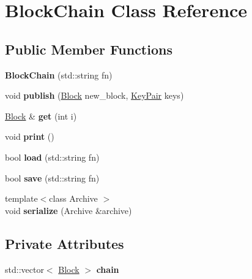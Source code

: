 \hypertarget{classBlockChain}{}\section{Block\+Chain Class Reference}
\label{classBlockChain}
\subsection*{Public Member Functions}
\begin{DoxyCompactItemize}
\item 
{\bfseries Block\+Chain} (std\+::string fn)\hypertarget{classBlockChain_a9bc8e53ff2b8692c748aa3480df75641}{}\label{classBlockChain_a9bc8e53ff2b8692c748aa3480df75641}

\item 
void {\bfseries publish} (\hyperlink{classBlock}{Block} new\+\_\+block, \hyperlink{classKeyPair}{Key\+Pair} keys)\hypertarget{classBlockChain_a5a736f3e931b3cede121156656af8d26}{}\label{classBlockChain_a5a736f3e931b3cede121156656af8d26}

\item 
\hyperlink{classBlock}{Block} \& {\bfseries get} (int i)\hypertarget{classBlockChain_aafe530005f2570870d8b8568829267e4}{}\label{classBlockChain_aafe530005f2570870d8b8568829267e4}

\item 
void {\bfseries print} ()\hypertarget{classBlockChain_a209b38447c083539336b7d07bd2e0711}{}\label{classBlockChain_a209b38447c083539336b7d07bd2e0711}

\item 
bool {\bfseries load} (std\+::string fn)\hypertarget{classBlockChain_a8a2be83195364edb05bd3c993a4e29c3}{}\label{classBlockChain_a8a2be83195364edb05bd3c993a4e29c3}

\item 
bool {\bfseries save} (std\+::string fn)\hypertarget{classBlockChain_a1b9b79fc37841b05b70f3eda695bda9f}{}\label{classBlockChain_a1b9b79fc37841b05b70f3eda695bda9f}

\item 
{\footnotesize template$<$class Archive $>$ }\\void {\bfseries serialize} (Archive \&archive)\hypertarget{classBlockChain_a87699a6eb7eae5814ba6d5f5029beee7}{}\label{classBlockChain_a87699a6eb7eae5814ba6d5f5029beee7}

\end{DoxyCompactItemize}
\subsection*{Private Attributes}
\begin{DoxyCompactItemize}
\item 
std\+::vector$<$ \hyperlink{classBlock}{Block} $>$ {\bfseries chain}\hypertarget{classBlockChain_a9fbfef68d36670a9fa51ff2b3388233c}{}\label{classBlockChain_a9fbfef68d36670a9fa51ff2b3388233c}

\end{DoxyCompactItemize}


